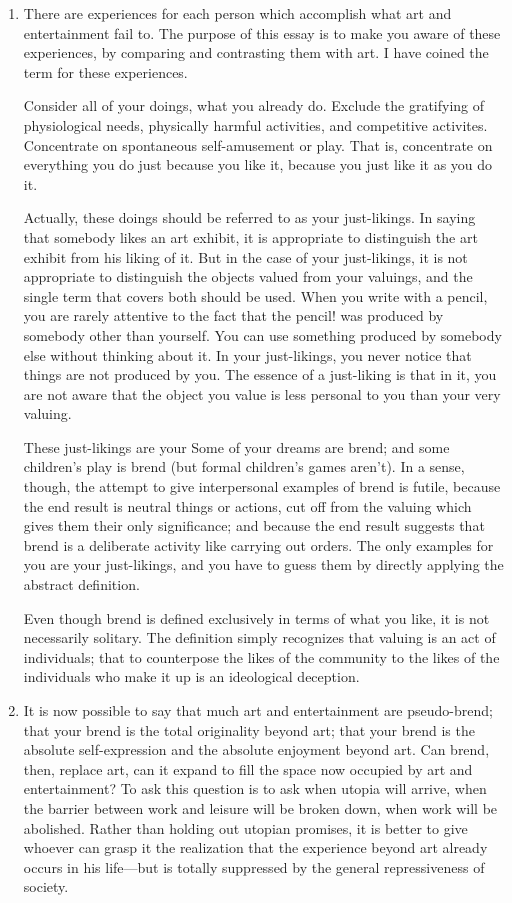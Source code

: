 \documentclass[10pt,twoside,draft]{memoir}
\begin{document}
{\begin{enumerate}
\item There are experiences for each person which accomplish what art and 
entertainment fail to. The purpose of this essay is to make you aware of 
these experiences, by comparing and contrasting them with art. I have 
coined the term  for these experiences. 

Consider all of your doings, what you already do. Exclude the gratifying of 
physiological needs, physically harmful activities, and competitive activites. 
Concentrate on spontaneous self-amusement or play. That is, concentrate on 
everything you do just because you like it, because you just like it as you do 
it. 

Actually, these doings should be referred to as your just-likings. In saying 
that somebody likes an art exhibit, it is appropriate to distinguish the art 
exhibit from his liking of it. But in the case of your just-likings, it is not 
appropriate to distinguish the objects valued from your valuings, and the 
single term that covers both should be used. When you write with a pencil, 
you are rarely attentive to the fact that the pencil! was produced by 
somebody other than yourself. You can use something produced by 
somebody else without thinking about it. In your just-likings, you never 
notice that things are not produced by you. The essence of a just-liking is 
that in it, you are not aware that the object you value is less personal to you 
than your very valuing. 

These just-likings are your  Some of your dreams are brend; and 
some children's play is brend (but formal children's games aren't). In a sense, 
though, the attempt to give interpersonal examples of brend is futile, 
because the end result is neutral things or actions, cut off from the valuing 
which gives them their only significance; and because the end result suggests 
that brend is a deliberate activity like carrying out orders. The only examples 
for you are your just-likings, and you have to guess them by directly 
applying the abstract definition. 

Even though brend is defined exclusively in terms of what you like, it is not 
necessarily solitary. The definition simply recognizes that valuing is an act of 
individuals; that to counterpose the likes of the community to the likes of 
the individuals who make it up is an ideological deception. 

\item It is now possible to say that much art and entertainment are 
pseudo-brend; that your brend is the total originality beyond art; that your 
brend is the absolute self-expression and the absolute enjoyment beyond art. 
Can brend, then, replace art, can it expand to fill the space now occupied by 
art and entertainment? To ask this question is to ask when utopia will 
arrive, when the barrier between work and leisure will be broken down, 
when work will be abolished. Rather than holding out utopian promises, it is 
better to give whoever can grasp it the realization that the experience 
beyond art already occurs in his life---but is totally suppressed by the general 
repressiveness of society. 
\end{enumerate}


}
\end{document}
